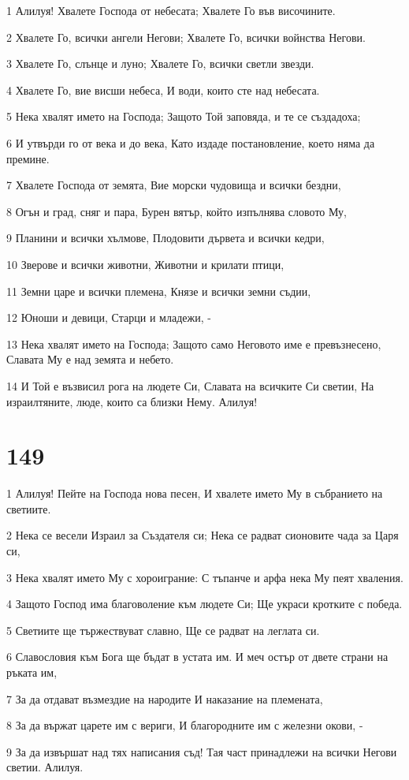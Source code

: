 \par 1 Алилуя! Хвалете Господа от небесата; Хвалете Го във височините.
\par 2 Хвалете Го, всички ангели Негови; Хвалете Го, всички войнства Негови.
\par 3 Хвалете Го, слънце и луно; Хвалете Го, всички светли звезди.
\par 4 Хвалете Го, вие висши небеса, И води, които сте над небесата.
\par 5 Нека хвалят името на Господа; Защото Той заповяда, и те се създадоха;
\par 6 И утвърди го от века и до века, Като издаде постановление, което няма да премине.
\par 7 Хвалете Господа от земята, Вие морски чудовища и всички бездни,
\par 8 Огън и град, сняг и пара, Бурен вятър, който изпълнява словото Му,
\par 9 Планини и всички хълмове, Плодовити дървета и всички кедри,
\par 10 Зверове и всички животни, Животни и крилати птици,
\par 11 Земни царе и всички племена, Князе и всички земни съдии,
\par 12 Юноши и девици, Старци и младежи, -
\par 13 Нека хвалят името на Господа; Защото само Неговото име е превъзнесено, Славата Му е над земята и небето.
\par 14 И Той е възвисил рога на людете Си, Славата на всичките Си светии, На израилтяните, люде, които са близки Нему. Алилуя!

\chapter{149}

\par 1 Алилуя! Пейте на Господа нова песен, И хвалете името Му в събранието на светиите.
\par 2 Нека се весели Израил за Създателя си; Нека се радват сионовите чада за Царя си,
\par 3 Нека хвалят името Му с хороиграние: С тъпанче и арфа нека Му пеят хваления.
\par 4 Защото Господ има благоволение към людете Си; Ще украси кротките с победа.
\par 5 Светиите ще тържествуват славно, Ще се радват на леглата си.
\par 6 Славословия към Бога ще бъдат в устата им. И меч остър от двете страни на ръката им,
\par 7 За да отдават възмездие на народите И наказание на племената,
\par 8 За да вържат царете им с вериги, И благородните им с железни окови, -
\par 9 За да извършат над тях написания съд! Тая част принадлежи на всички Негови светии. Алилуя.

